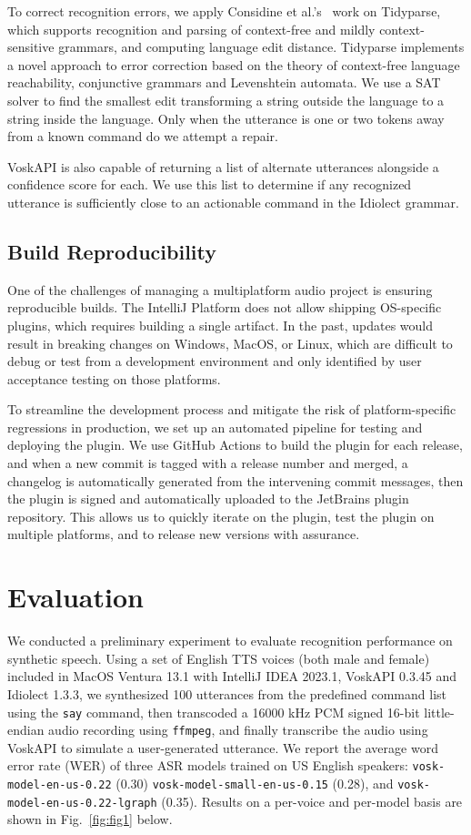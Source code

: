 \documentclass[conference]{IEEEtran}
\begin{document}
To correct recognition errors, we apply Considine et al.'s~\cite{considine2022tidyparse} work on Tidyparse, which supports recognition and parsing of context-free and mildly context-sensitive grammars, and computing language edit distance. Tidyparse implements a novel approach to error correction based on the theory of context-free language reachability, conjunctive grammars and Levenshtein automata. We use a SAT solver to find the smallest edit transforming a string outside the language to a string inside the language. Only when the utterance is one or two tokens away from a known command do we attempt a repair.

VoskAPI is also capable of returning a list of alternate utterances alongside a confidence score for each. We use this list to determine if any recognized utterance is sufficiently close to an actionable command in the Idiolect grammar.

\subsection{Build Reproducibility}

One of the challenges of managing a multiplatform audio project is ensuring reproducible builds. The IntelliJ Platform does not allow shipping OS-specific plugins, which requires building a single artifact. In the past, updates would result in breaking changes on Windows, MacOS, or Linux, which are difficult to debug or test from a development environment and only identified by user acceptance testing on those platforms.

To streamline the development process and mitigate the risk of platform-specific regressions in production, we set up an automated pipeline for testing and deploying the plugin. We use GitHub Actions to build the plugin for each release, and when a new commit is tagged with a release number and merged, a changelog is automatically generated from the intervening commit messages, then the plugin is signed and automatically uploaded to the JetBrains plugin repository. This allows us to quickly iterate on the plugin, test the plugin on multiple platforms, and to release new versions with assurance.

\section{Evaluation}

We conducted a preliminary experiment to evaluate recognition performance on synthetic speech. Using a set of English TTS voices (both male and female) included in MacOS Ventura 13.1 with IntelliJ IDEA 2023.1, VoskAPI 0.3.45 and Idiolect 1.3.3, we synthesized 100 utterances from the predefined command list using the \texttt{say} command, then transcoded a 16000 kHz PCM signed 16-bit little-endian audio recording using \texttt{ffmpeg}, and finally transcribe the audio using VoskAPI to simulate a user-generated utterance. We report the average word error rate (WER) of three ASR models trained on US English speakers: \texttt{vosk-model-en-us-0.22} (0.30) \texttt{vosk-model-small-en-us-0.15} (0.28), and \texttt{vosk-model-en-us-0.22-lgraph} (0.35). Results on a per-voice and per-model basis are shown in  Fig.~\ref{fig:fig1} below.
\end{document}
